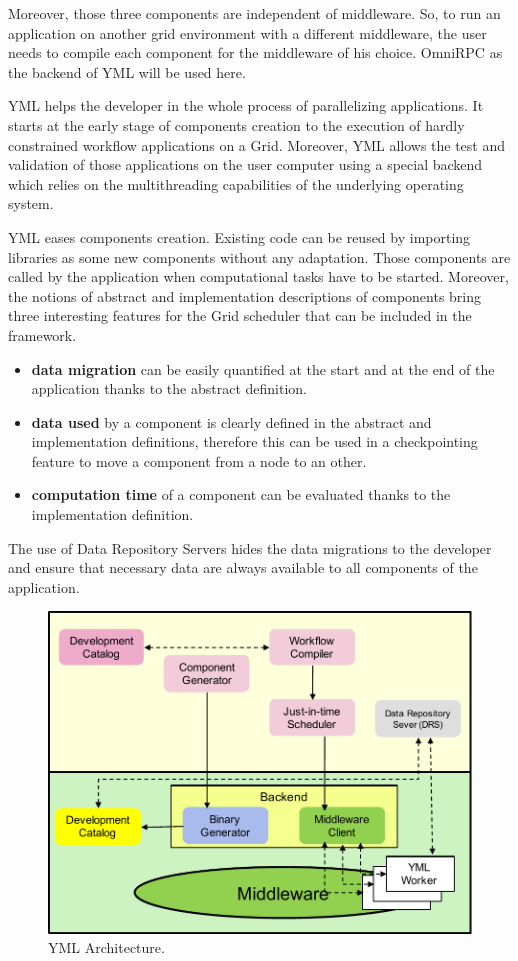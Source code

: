 Moreover, those three components are independent of middleware. So, to run an application on another grid environment with a different middleware, the user needs to compile each component for the middleware of his choice. OmniRPC as the backend of YML will be used here.

YML helps the developer in the whole process of parallelizing applications. It starts at the early stage of components creation to the execution of hardly constrained workflow applications on a Grid. Moreover, YML allows the test and validation of those applications on the user computer using a special backend which relies on the multithreading capabilities of the underlying operating system.

YML eases components creation. Existing code can be reused by importing libraries as some new components without any adaptation. Those components are called by the application when computational tasks have to be started. Moreover, the notions of abstract and implementation descriptions of components bring three interesting features for the Grid scheduler that can be included in the framework.

\begin{itemize}
	\item \textbf{data migration} can be easily quantified at the start and at the end of the application thanks to the abstract definition.
	\item \textbf{data used} by a component is clearly defined in the abstract and implementation definitions, therefore this can be used in a checkpointing feature to move a component from a node to an other.
	\item \textbf{computation time} of a component can be evaluated thanks to the implementation definition.
\end{itemize}

The use of Data Repository Servers hides the data migrations to the developer and ensure that necessary data are always available to all components of the application.

\begin{figure}[htbp]
	\centering
	\includegraphics[width=.92\linewidth]{fig/yml-arch.pdf}
	\caption{YML Architecture.}
	\label{yml-arch}
\end{figure}

